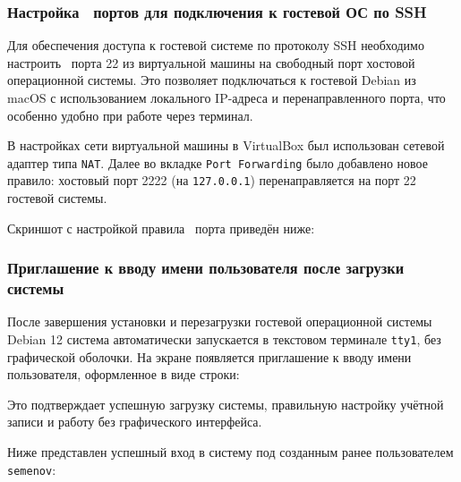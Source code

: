 
\subsubsection*{Настройка \frqq\ портов для подключения к гостевой ОС по SSH}

Для обеспечения доступа к гостевой системе по протоколу SSH необходимо настроить \frqq\ порта 22 из виртуальной машины на свободный порт хостовой операционной системы. Это позволяет подключаться к гостевой Debian из macOS с использованием локального IP-адреса и перенаправленного порта, что особенно удобно при работе через терминал.

В настройках сети виртуальной машины в VirtualBox был использован сетевой адаптер типа \texttt{NAT}. Далее во вкладке \texttt{Port Forwarding} было добавлено новое правило: хостовый порт 2222 (на \texttt{127.0.0.1}) перенаправляется на порт 22 гостевой системы.

Скриншот с настройкой правила \frqq\ порта приведён ниже:


\subsubsection*{Приглашение к вводу имени пользователя после загрузки системы}

После завершения установки и перезагрузки гостевой операционной системы Debian 12 система автоматически запускается в текстовом терминале \texttt{tty1}, без графической оболочки. На экране появляется приглашение к вводу имени пользователя, оформленное в виде строки:


Это подтверждает успешную загрузку системы, правильную настройку учётной записи и работу без графического интерфейса.

Ниже представлен успешный вход в систему под созданным ранее пользователем \texttt{semenov}:

